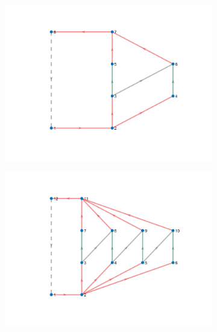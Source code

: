 \documentclass{article}
\begin{document}
\begin{figure}[htbp]
  \centering
  \begin{subfigure}[b]{0.3\textwidth}
    \includegraphics[width=\textwidth]{../attachments/f-dege-mac-2.png}
    \caption{}
    \label{fig:f2-mac}
  \end{subfigure}
  \hspace{0.05\textwidth}
  \begin{subfigure}[b]{0.3\textwidth}
    \includegraphics[width=\textwidth]{../attachments/f-dege-mac-4.png}
    \caption{}
    \label{fig:f4-mac}
  \end{subfigure}
  \hspace{0.05\textwidth}
  \begin{subfigure}[b]{0.45\textwidth}

\end{subfigure}
\end{figure}
\end{document}
